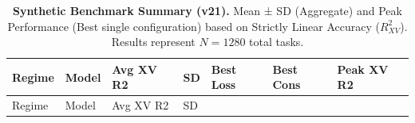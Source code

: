 \documentclass[
  letterpaper,
]{report}
\begin{document}
\begin{longtable}[]{@{}
  >{\raggedright\arraybackslash}p{}
  >{\raggedright\arraybackslash}p{}
  >{\raggedleft\arraybackslash}p{}
  >{\raggedleft\arraybackslash}p{}
  >{\raggedright\arraybackslash}p{}
  >{\raggedright\arraybackslash}p{}
  >{\raggedleft\arraybackslash}p{}@{}}
\caption{\textbf{Synthetic Benchmark Summary (v21).} Mean ± SD
(Aggregate) and Peak Performance (Best single configuration) based on
Strictly Linear Accuracy (\(R^2_{XV}\)). Results represent \(N=1280\)
total tasks.}\label{tbl-synthetic-summary}\tabularnewline
\toprule\noalign{}
\begin{minipage}[b]{\linewidth}\raggedright
Regime
\end{minipage} & \begin{minipage}[b]{\linewidth}\raggedright
Model
\end{minipage} & \begin{minipage}[b]{\linewidth}\raggedleft
Avg XV R2
\end{minipage} & \begin{minipage}[b]{\linewidth}\raggedleft
SD
\end{minipage} & \begin{minipage}[b]{\linewidth}\raggedright
Best Loss
\end{minipage} & \begin{minipage}[b]{\linewidth}\raggedright
Best Cons
\end{minipage} & \begin{minipage}[b]{\linewidth}\raggedleft
Peak XV R2
\end{minipage} \\
\midrule\noalign{}
\endfirsthead
\toprule\noalign{}
\begin{minipage}[b]{\linewidth}\raggedright
Regime
\end{minipage} & \begin{minipage}[b]{\linewidth}\raggedright
Model
\end{minipage} & \begin{minipage}[b]{\linewidth}\raggedleft
Avg XV R2
\end{minipage} & \begin{minipage}[b]{\linewidth}\raggedleft
SD
\end{minipage} & \begin{minipage}[b]{\linewidth}\raggedright

\end{minipage}
\end{longtable}
\end{document}
